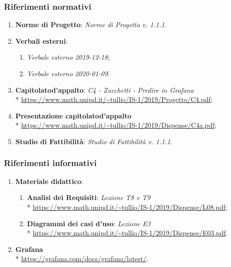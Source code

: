 		\subsubsection{Riferimenti normativi}
			\begin{enumerate}
				\item \textbf{Norme di Progetto}: \textit{Norme di Progetto v. 1.1.1}.
				\item \textbf{Verbali esterni}:
				\begin{enumerate}
					\item \textit{Verbale esterno 2019-12-18};
					\item \textit{Verbale esterno 2020-01-09}.
				\end{enumerate}
				\item \textbf{Capitolato}\glosp \textbf{d'appalto}: \textit{C4 - Zucchetti - Predire in Grafana}\glo \\*
				\url{https://www.math.unipd.it/~tullio/IS-1/2019/Progetto/C4.pdf};
				\item \textbf{Presentazione capitolato}\glosp \textbf{d'appalto} \\*
				\url{https://www.math.unipd.it/~tullio/IS-1/2019/Dispense/C4a.pdf};
				\item \textbf{Studio di Fattibilità}: \textit{Studio di Fattibilità v. 1.1.1}.
			\end{enumerate}
		\subsubsection{Riferimenti informativi}
			\begin{enumerate}
				\item \textbf{Materiale didattico}:
				\begin{enumerate}
					\item \textbf{Analisi dei Requisiti}: \textit{Lezione T8 e T9} \\*
					\url{https://www.math.unipd.it/~tullio/IS-1/2019/Dispense/L08.pdf};
					\item \textbf{Diagrammi dei casi d'uso}\glo: \textit{Lezione E3} \\*
					\url{https://www.math.unipd.it/~tullio/IS-1/2019/Dispense/E03.pdf}.
				\end{enumerate}
				\item \textbf{Grafana}\glo \\*
					\url{https://grafana.com/docs/grafana/latest/}.
			\end{enumerate}
